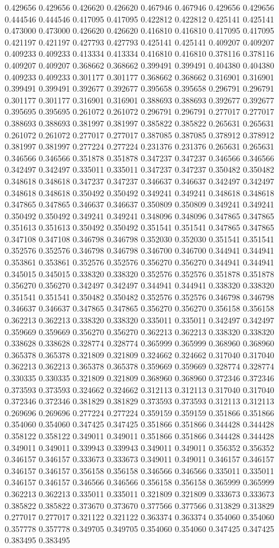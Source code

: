 0.429656 0.429656 0.426620 0.426620 0.467946 0.467946 0.429656 0.429656 0.444546 0.444546 0.417095 0.417095 0.422812 0.422812 0.425141 0.425141 0.473000 0.473000 0.426620 0.426620 0.416810 0.416810 0.417095 0.417095 0.421197 0.421197 0.427793 0.427793 0.425141 0.425141 0.409207 0.409207 0.409233 0.409233 0.413334 0.413334 0.416810 0.416810 0.378116 0.378116 0.409207 0.409207 0.368662 0.368662 0.399491 0.399491 0.404380 0.404380 0.409233 0.409233 0.301177 0.301177 0.368662 0.368662 0.316901 0.316901 0.399491 0.399491 0.392677 0.392677 0.395658 0.395658 0.296791 0.296791 0.301177 0.301177 0.316901 0.316901 0.388693 0.388693 0.392677 0.392677 0.395695 0.395695 0.261072 0.261072 0.296791 0.296791 0.277017 0.277017 0.388693 0.388693 0.381997 0.381997 0.385822 0.385822 0.265631 0.265631 0.261072 0.261072 0.277017 0.277017 0.387085 0.387085 0.378912 0.378912 0.381997 0.381997 0.277224 0.277224 0.231376 0.231376 0.265631 0.265631 0.346566 0.346566 0.351878 0.351878 0.347237 0.347237 0.346566 0.346566 0.342497 0.342497 0.335011 0.335011 0.347237 0.347237 0.350482 0.350482 0.348618 0.348618 0.347237 0.347237 0.346637 0.346637 0.342497 0.342497 0.348618 0.348618 0.350492 0.350492 0.349241 0.349241 0.348618 0.348618 0.347865 0.347865 0.346637 0.346637 0.350809 0.350809 0.349241 0.349241 0.350492 0.350492 0.349241 0.349241 0.348096 0.348096 0.347865 0.347865 0.351613 0.351613 0.350492 0.350492 0.351541 0.351541 0.347865 0.347865 0.347108 0.347108 0.346798 0.346798 0.352030 0.352030 0.351541 0.351541 0.352576 0.352576 0.346798 0.346798 0.346700 0.346700 0.344941 0.344941 0.353861 0.353861 0.352576 0.352576 0.356270 0.356270 0.344941 0.344941 0.345015 0.345015 0.338320 0.338320 0.352576 0.352576 0.351878 0.351878 0.356270 0.356270 0.342497 0.342497 0.344941 0.344941 0.338320 0.338320 0.351541 0.351541 0.350482 0.350482 0.352576 0.352576 0.346798 0.346798 0.346637 0.346637 0.347865 0.347865 0.356270 0.356270 0.356158 0.356158 0.362213 0.362213 0.338320 0.338320 0.335011 0.335011 0.342497 0.342497 0.359669 0.359669 0.356270 0.356270 0.362213 0.362213 0.338320 0.338320 0.338628 0.338628 0.328774 0.328774 0.365999 0.365999 0.368960 0.368960 0.365378 0.365378 0.321809 0.321809 0.324662 0.324662 0.317040 0.317040 0.362213 0.362213 0.365378 0.365378 0.359669 0.359669 0.328774 0.328774 0.330335 0.330335 0.321809 0.321809 0.368960 0.368960 0.372346 0.372346 0.373593 0.373593 0.324662 0.324662 0.312113 0.312113 0.317040 0.317040 0.372346 0.372346 0.381829 0.381829 0.373593 0.373593 0.312113 0.312113 0.269696 0.269696 0.277224 0.277224 0.359159 0.359159 0.351866 0.351866 0.354060 0.354060 0.347425 0.347425 0.351866 0.351866 0.344428 0.344428 0.358122 0.358122 0.349011 0.349011 0.351866 0.351866 0.344428 0.344428 0.349011 0.349011 0.339943 0.339943 0.349011 0.349011 0.356352 0.356352 0.346157 0.346157 0.333673 0.333673 0.349011 0.349011 0.346157 0.346157 0.346157 0.346157 0.356158 0.356158 0.346566 0.346566 0.335011 0.335011 0.346157 0.346157 0.346566 0.346566 0.356158 0.356158 0.365999 0.365999 0.362213 0.362213 0.335011 0.335011 0.321809 0.321809 0.333673 0.333673 0.385822 0.385822 0.373670 0.373670 0.377566 0.377566 0.313829 0.313829 0.277017 0.277017 0.321122 0.321122 0.363374 0.363374 0.354060 0.354060 0.357778 0.357778 0.349705 0.349705 0.354060 0.354060 0.347425 0.347425 0.383495 0.383495 